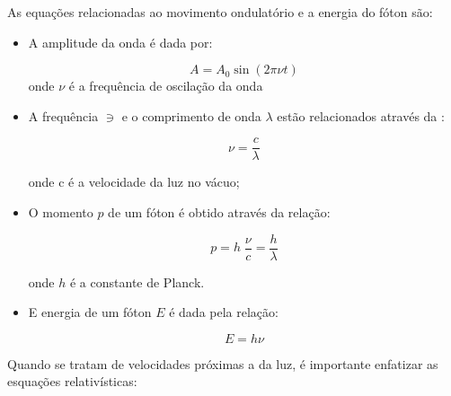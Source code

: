 \documentclass[11pt,a4paper]{article}
\begin{document}
            As equações relacionadas ao movimento ondulatório e a energia do fóton são:

            \begin{itemize}
                \item A amplitude da onda é dada por:
                
                    \begin{equation}
                        A = A_0 \sin (2 \pi \nu t)
                    \end{equation}
                    \noindent onde $\nu$ é a frequência de oscilação da onda
                
                \item A frequência $\ni$ e o comprimento de onda $\lambda$ estão relacionados através da :
                    
                    \begin{equation}
                        \nu = \frac{c}{\lambda}
                    \end{equation}

                    \noindent onde c é a velocidade da luz no vácuo;

                \item O momento $p$ de um fóton é obtido através da relação:
                
                    \begin{equation}
                        p = h \; \frac{\nu}{c} = \frac{h}{\lambda}
                    \end{equation}

                    \noindent onde $h$ é a constante de Planck.

                \item E energia de um fóton $E$ é dada pela relação:
                
                    \begin{equation}
                        E = h \nu
                    \end{equation}

            \end{itemize}

            Quando se tratam de velocidades próximas a da luz, é importante enfatizar as esquações relativísticas:
\end{document}

